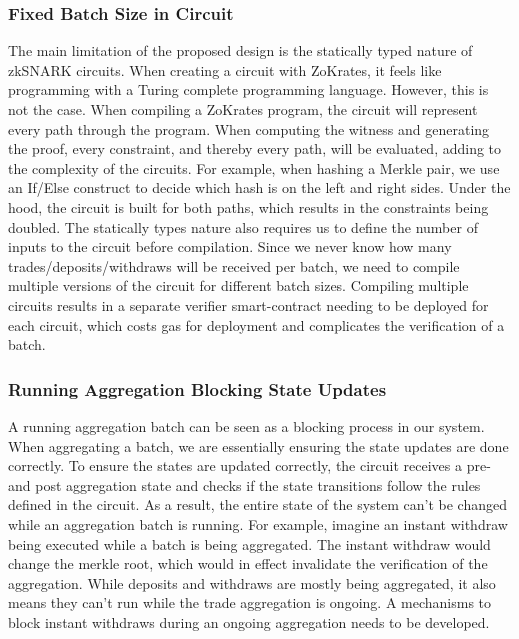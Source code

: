 \documentclass[../../thesis.tex]{subfiles}
\begin{document}
\subsubsection{Fixed Batch Size in Circuit}
The main limitation of the proposed design is the statically typed nature of zkSNARK circuits. When creating a circuit with ZoKrates, it feels like programming with a Turing complete programming language. However, this is not the case. When compiling a ZoKrates program, the circuit will represent every path through the program. When computing the witness and generating the proof, every constraint, and thereby every path, will be evaluated, adding to the complexity of the circuits. For example, when hashing a Merkle pair, we use an If/Else construct to decide which hash is on the left and right sides. Under the hood, the circuit is built for both paths, which results in the constraints being doubled. The statically types nature also requires us to define the number of inputs to the circuit before compilation. Since we never know how many trades/deposits/withdraws will be received per batch, we need to compile multiple versions of the circuit for different batch sizes. Compiling multiple circuits results in a separate verifier smart-contract needing to be deployed for each circuit, which costs gas for deployment and complicates the verification of a batch.

\subsubsection{Running Aggregation Blocking State Updates}
A running aggregation batch can be seen as a blocking process in our system. When aggregating a batch, we are essentially ensuring the state updates are done correctly. To ensure the states are updated correctly, the circuit receives a pre- and post aggregation state and checks if the state transitions follow the rules defined in the circuit. As a result, the entire state of the system can't be changed while an aggregation batch is running. For example, imagine an instant withdraw being executed while a batch is being aggregated. The instant withdraw would change the merkle root, which would in effect invalidate the verification of the aggregation. While deposits and withdraws are mostly being aggregated, it also means they can't run while the trade aggregation is ongoing. A mechanisms to block instant withdraws during an ongoing aggregation needs to be developed. 
\end{document}
